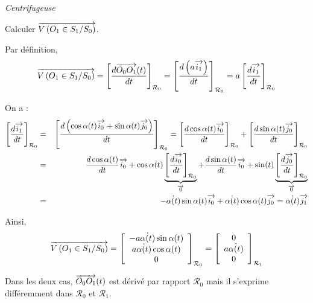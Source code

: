 \documentclass[10pt,oneside]{article}
\begin{document}
\begin{exemple}
\textit{Centrifugeuse}

Calculer $\overrightarrow{V\left( {O_1} \in {S_1}/{S_0}\right)}$.

Par définition, 
$$
\overrightarrow{V\left( {O_1} \in {S_1}/{S_0}\right)} 
= \left[\dfrac{d\overrightarrow{O_0O_1}(t)}{dt}\right]_{\mathcal{R}_0}
= \left[\dfrac{d \left(a \overrightarrow{i_1}\right) }{dt}\right]_{\mathcal{R}_0}
= a \left[\dfrac{d  \overrightarrow{i_1} }{dt}\right]_{\mathcal{R}_0}
$$

On a :
\begin{eqnarray*}
\left[\dfrac{d  \overrightarrow{i_1} }{dt}\right]_{\mathcal{R}_0}
&=&\left[\dfrac{d \left(\cos\alpha(t)\overrightarrow{i_0}+\sin\alpha(t)\overrightarrow{j_0} \right)}{dt}\right]_{\mathcal{R}_0}
=\left[\dfrac{d  \cos\alpha(t)\overrightarrow{i_0}}{dt}\right]_{\mathcal{R}_0}
+\left[\dfrac{d  \sin\alpha(t)\overrightarrow{j_0} }{dt}\right]_{\mathcal{R}_0}\\
& = & 
\dfrac{d \cos\alpha(t)}{dt} \overrightarrow{i_0}  
+\cos\alpha(t)\underbrace{\left[\dfrac{d  \overrightarrow{i_0}}{dt}\right]_{\mathcal{R}_0}}_{\overrightarrow{0}}
+\dfrac{d \sin\alpha(t)}{dt} \overrightarrow{i_0}  
+\sin(t)\underbrace{\left[\dfrac{d  \overrightarrow{j_0}}{dt}\right]_{\mathcal{R}_0}}_{\overrightarrow{0}}\\
& = & -\dot{\alpha(t)}\sin\alpha(t) \overrightarrow{i_0}   + \dot{\alpha(t)}\cos\alpha(t) \overrightarrow{j_0}  = 
\dot{\alpha(t)}\overrightarrow{j_1}
\end{eqnarray*}

Ainsi,
$$
\overrightarrow{V\left( {O_1} \in {S_1}/{S_0}\right)} 
= \left[\begin{array}{c} 
-a\dot{\alpha(t)}\sin\alpha(t) \\
a \dot{\alpha(t)}\cos\alpha(t) \\
0 \end{array}\right]_{\mathcal{R}_0}
=\left[\begin{array}{c} 0 \\ a\dot{\alpha(t)} \\ 0\end{array}\right]_{\mathcal{R}_1}
$$

Dans les deux cas, $\overrightarrow{O_0O_1}(t)$ est dérivé par rapport $\mathcal{R}_0$ mais il s'exprime différemment dans $\mathcal{R}_0$ et $\mathcal{R}_1$.


\end{exemple}
\end{document}
